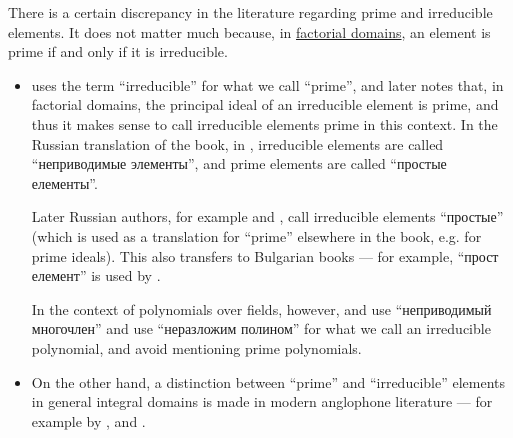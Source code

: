 \begin{remark}\label{rem:prime_and_irreducible_terminology}
  There is a certain discrepancy in the literature regarding prime and irreducible elements. It does not matter much because, in \hyperref[def:factorial_domain]{factorial domains}, an element is prime if and only if it is irreducible.

  \begin{itemize}
    \item {} uses the term \enquote{irreducible} for what we call \enquote{prime}, and later notes that, in factorial domains, the principal ideal of an irreducible element is prime, and thus it makes sense to call irreducible elements prime in this context. In the Russian translation of the book, in \cite[89]{Костиркин1968Ленг}, irreducible elements are called \enquote{неприводимые элементы}, and prime elements are called \enquote{простые елементы}.

    Later Russian authors, for example  and , call irreducible elements \enquote{простые} (which is used as a translation for \enquote{prime} elsewhere in the book, e.g. for prime ideals). This also transfers to Bulgarian books --- for example, \enquote{прост елемент} is used by .

    In the context of polynomials over fields, however,  and  use \enquote{неприводимый многочлен} and  use \enquote{неразложим полином} for what we call an irreducible polynomial, and avoid mentioning prime polynomials.

    \item On the other hand, a distinction between \enquote{prime} and \enquote{irreducible} elements in general integral domains is made in modern anglophone literature --- for example by ,  and .
  \end{itemize}
\end{remark}

